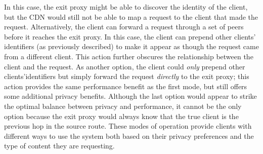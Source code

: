 In this case, the exit proxy might be able to discover the identity of the client,
but the CDN would still not be able to map a request to the client that made the
request.
Alternatively, the client can forward a request
through a set of peers before it reaches the exit proxy.  In this case, the client
can 
prepend other clients' identifiers (as previously described) to make it appear as
though the request came from
a different client.  This action further obscures the relationship between the client
and the request.  As another option, the client could {\it only} prepend
other clients'identifiers but simply forward
the request {\em directly} to the exit proxy; this action provides the same performance
benefit as the first
mode, but still offers some additional privacy benefits.  Although the last option
would appear to strike the optimal balance between privacy and performance, it cannot
be
the only option because the exit proxy would always know that the true client is the previous hop 
in the source route.  These modes of operation provide clients with different ways to use 
the system both based on their privacy preferences and the type of content they are requesting.

